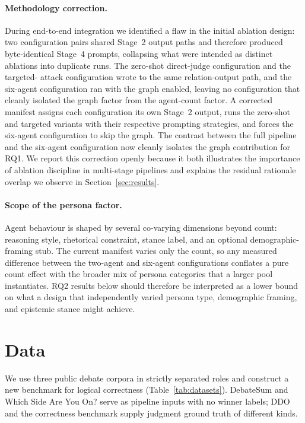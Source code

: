 \documentclass[11pt,twocolumn,letterpaper]{article}
\begin{document}
\paragraph{Methodology correction.}
\label{para:v21}
During end-to-end integration we identified a flaw in the initial
ablation design: two configuration pairs shared Stage~2 output
paths and therefore produced byte-identical Stage~4 prompts,
collapsing what were intended as distinct ablations into duplicate
runs. The zero-shot direct-judge configuration and the targeted-%
attack configuration wrote to the same relation-output path, and
the six-agent configuration ran with the graph enabled, leaving no
configuration that cleanly isolated the graph factor from the
agent-count factor. A corrected manifest assigns each configuration
its own Stage~2 output, runs the zero-shot and targeted variants
with their respective prompting strategies, and forces the
six-agent configuration to skip the graph. The contrast between
the full pipeline and the six-agent configuration now cleanly
isolates the graph contribution for RQ1. We report this correction
openly because it both illustrates the importance of ablation
discipline in multi-stage pipelines and explains the residual
rationale overlap we observe in Section~\ref{sec:results}.

\paragraph{Scope of the persona factor.}
\label{para:persona}
Agent behaviour is shaped by several co-varying dimensions beyond
count: reasoning style, rhetorical constraint, stance label, and an
optional demographic-framing stub. The current manifest varies only
the count, so any measured difference between the two-agent and
six-agent configurations conflates a pure count effect with the
broader mix of persona categories that a larger pool instantiates.
RQ2 results below should therefore be interpreted as a lower bound
on what a design that independently varied persona type, demographic
framing, and epistemic stance might achieve.

\section{Data}
\label{sec:data}

We use three public debate corpora in strictly separated roles and
construct a new benchmark for logical correctness
(Table~\ref{tab:datasets}). DebateSum and Which Side Are You On?
serve as pipeline inputs with no winner labels; DDO and the
correctness benchmark supply judgment ground truth of different
kinds.
\end{document}
